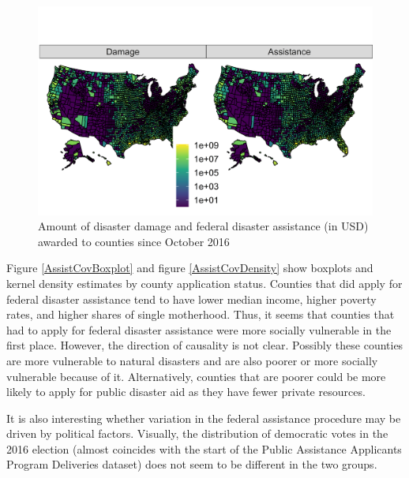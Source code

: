 \begin{figure}[!h]
	\centering
	\includegraphics[scale=1]{"../Code & Data/AssistanceMap.png"}
	\caption{Amount of disaster damage and federal disaster assistance (in USD) awarded to counties since October 2016}
	\label{AssistanceMap}
\end{figure}


Figure \ref{AssistCovBoxplot} and figure \ref{AssistCovDensity} show boxplots and kernel density estimates by county application status. Counties that did apply for federal disaster assistance tend to have lower median income, higher poverty rates, and higher shares of single motherhood. Thus, it seems that counties that had to apply for federal disaster assistance were more socially vulnerable in the first place. However, the direction of causality is not clear. Possibly these counties are more vulnerable to natural disasters and are also poorer or more socially vulnerable because of it. Alternatively, counties that are poorer could be more likely to apply for public disaster aid as they have fewer private resources.

It is also interesting whether variation in the federal assistance procedure may be driven by political factors. Visually, the distribution of democratic votes in the 2016 election (almost coincides with the start of the Public Assistance Applicants Program Deliveries dataset) does not seem to be different in the two groups.



